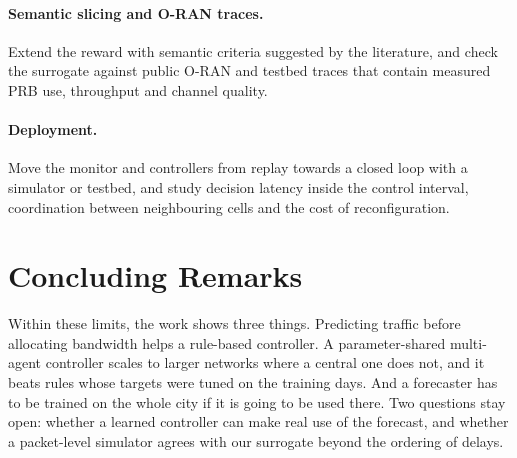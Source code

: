 \paragraph{Semantic slicing and O-RAN traces.}
Extend the reward with semantic criteria suggested by the literature, and check the surrogate against public O-RAN and testbed traces that contain measured PRB use, throughput and channel quality.

\paragraph{Deployment.}
Move the monitor and controllers from replay towards a closed loop with a simulator or testbed, and study decision latency inside the control interval, coordination between neighbouring cells and the cost of reconfiguration.

\section{Concluding Remarks}
Within these limits, the work shows three things. Predicting traffic before allocating bandwidth helps a rule-based controller. A parameter-shared multi-agent controller scales to larger networks where a central one does not, and it beats rules whose targets were tuned on the training days. And a forecaster has to be trained on the whole city if it is going to be used there. Two questions stay open: whether a learned controller can make real use of the forecast, and whether a packet-level simulator agrees with our surrogate beyond the ordering of delays.

